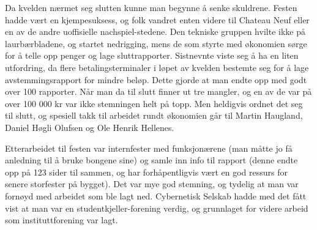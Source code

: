 Da kvelden nærmet seg slutten kunne man begynne å senke skuldrene. Festen hadde vært en kjempesuksess, og folk vandret enten videre til Chateau Neuf eller en av de andre uoffisielle nachspiel-stedene. Den tekniske gruppen hvilte ikke på laurbærbladene, og startet nedrigging, mens de som styrte med økonomien sørge for å telle opp penger og lage sluttrapporter. Sistnevnte viste seg å ha en liten utfordring, da flere betalingsterminaler i løpet av kvelden bestemte seg for å lage avstemmingsrapport for mindre beløp. Dette gjorde at man endte opp med godt over 100 rapporter. Når man da til slutt finner ut tre mangler, og en av de var på over 100 000 kr var ikke stemningen helt på topp. Men heldigvis ordnet det seg til slutt, og spesiell takk til arbeidet rundt økonomien går til Martin Haugland, Daniel Høgli Olufsen og Ole Henrik Hellenes.

Etterarbeidet til festen var internfester med funksjonærene (man måtte jo få anledning til å bruke bongene sine) og samle inn info til rapport (denne endte opp på 123 sider til sammen, og har forhåpentligvis vært en god ressurs for senere storfester på bygget). Det var mye god stemning, og tydelig at man var fornøyd med arbeidet som ble lagt ned. Cybernetisk Selskab hadde med det fått vist at man var en studentkjeller-forening verdig, og grunnlaget for videre arbeid som instituttforening var lagt.

